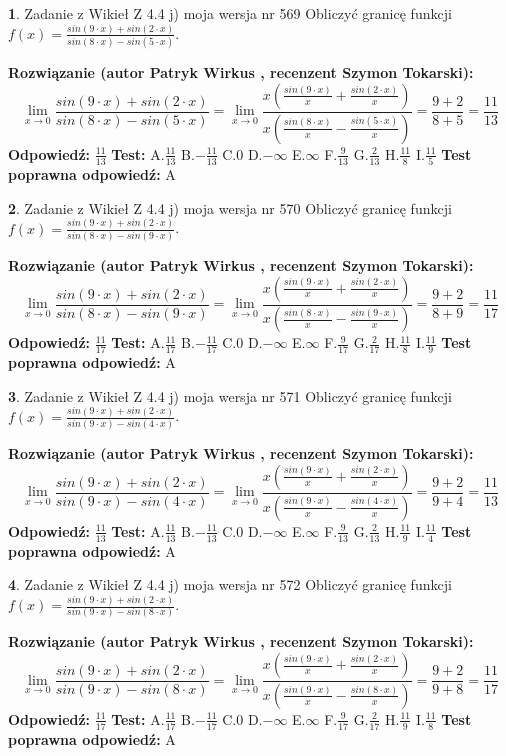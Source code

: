 \documentclass[12pt, a4paper]{article}
\theoremstyle{definition} %
\newtheorem{zad}{}
\newcommand{\zadStart}[1]{\begin{zad}#1\newline}
\newcommand{\zadStop}{\end{zad}}
\newcommand{\rozwStart}[2]{\noindent \textbf{Rozwiązanie (autor #1 , recenzent #2): }\newline}
\newcommand{\rozwStop}{\newline}
\newcommand{\odpStart}{\noindent \textbf{Odpowiedź:}\newline}
\newcommand{\odpStop}{\newline}
\newcommand{\testStart}{\noindent \textbf{Test:}\newline}
\newcommand{\testStop}{\newline}
\newcommand{\kluczStart}{\noindent \textbf{Test poprawna odpowiedź:}\newline}
\newcommand{\kluczStop}{\newline}
\begin{document}
\zadStart{Zadanie z Wikieł Z 4.4 j) moja wersja nr 569}
Obliczyć granicę funkcji $f(x)=\frac{sin(9\cdot x) +sin(2\cdot x)}{sin(8\cdot x) -sin(5\cdot x)}$.
\zadStop
\rozwStart{Patryk Wirkus}{Szymon Tokarski}
$$\lim\limits_{x\to 0}\frac{sin(9\cdot x) +sin(2\cdot x)}{sin(8\cdot x) -sin(5\cdot x)}=\lim\limits_{x\to 0}\frac{x(\frac{sin(9\cdot x)}{x}+\frac{sin(2\cdot x)}{x})}{x(\frac{sin(8\cdot x)}{x}-\frac{sin(5\cdot x)}{x})}=\frac{9+2}{8+5} = \frac{11}{13}$$
\rozwStop
\odpStart
$\frac{11}{13}$
\odpStop
\testStart
A.$\frac{11}{13}$
B.$-\frac{11}{13}$
C.$0$
D.$-\infty$
E.$\infty$
F.$\frac{9}{13}$
G.$\frac{2}{13}$
H.$\frac{11}{8}$
I.$\frac{11}{5}$
\testStop
\kluczStart
A
\kluczStop



\zadStart{Zadanie z Wikieł Z 4.4 j) moja wersja nr 570}
Obliczyć granicę funkcji $f(x)=\frac{sin(9\cdot x) +sin(2\cdot x)}{sin(8\cdot x) -sin(9\cdot x)}$.
\zadStop
\rozwStart{Patryk Wirkus}{Szymon Tokarski}
$$\lim\limits_{x\to 0}\frac{sin(9\cdot x) +sin(2\cdot x)}{sin(8\cdot x) -sin(9\cdot x)}=\lim\limits_{x\to 0}\frac{x(\frac{sin(9\cdot x)}{x}+\frac{sin(2\cdot x)}{x})}{x(\frac{sin(8\cdot x)}{x}-\frac{sin(9\cdot x)}{x})}=\frac{9+2}{8+9} = \frac{11}{17}$$
\rozwStop
\odpStart
$\frac{11}{17}$
\odpStop
\testStart
A.$\frac{11}{17}$
B.$-\frac{11}{17}$
C.$0$
D.$-\infty$
E.$\infty$
F.$\frac{9}{17}$
G.$\frac{2}{17}$
H.$\frac{11}{8}$
I.$\frac{11}{9}$
\testStop
\kluczStart
A
\kluczStop



\zadStart{Zadanie z Wikieł Z 4.4 j) moja wersja nr 571}
Obliczyć granicę funkcji $f(x)=\frac{sin(9\cdot x) +sin(2\cdot x)}{sin(9\cdot x) -sin(4\cdot x)}$.
\zadStop
\rozwStart{Patryk Wirkus}{Szymon Tokarski}
$$\lim\limits_{x\to 0}\frac{sin(9\cdot x) +sin(2\cdot x)}{sin(9\cdot x) -sin(4\cdot x)}=\lim\limits_{x\to 0}\frac{x(\frac{sin(9\cdot x)}{x}+\frac{sin(2\cdot x)}{x})}{x(\frac{sin(9\cdot x)}{x}-\frac{sin(4\cdot x)}{x})}=\frac{9+2}{9+4} = \frac{11}{13}$$
\rozwStop
\odpStart
$\frac{11}{13}$
\odpStop
\testStart
A.$\frac{11}{13}$
B.$-\frac{11}{13}$
C.$0$
D.$-\infty$
E.$\infty$
F.$\frac{9}{13}$
G.$\frac{2}{13}$
H.$\frac{11}{9}$
I.$\frac{11}{4}$
\testStop
\kluczStart
A
\kluczStop



\zadStart{Zadanie z Wikieł Z 4.4 j) moja wersja nr 572}
Obliczyć granicę funkcji $f(x)=\frac{sin(9\cdot x) +sin(2\cdot x)}{sin(9\cdot x) -sin(8\cdot x)}$.
\zadStop
\rozwStart{Patryk Wirkus}{Szymon Tokarski}
$$\lim\limits_{x\to 0}\frac{sin(9\cdot x) +sin(2\cdot x)}{sin(9\cdot x) -sin(8\cdot x)}=\lim\limits_{x\to 0}\frac{x(\frac{sin(9\cdot x)}{x}+\frac{sin(2\cdot x)}{x})}{x(\frac{sin(9\cdot x)}{x}-\frac{sin(8\cdot x)}{x})}=\frac{9+2}{9+8} = \frac{11}{17}$$
\rozwStop
\odpStart
$\frac{11}{17}$
\odpStop
\testStart
A.$\frac{11}{17}$
B.$-\frac{11}{17}$
C.$0$
D.$-\infty$
E.$\infty$
F.$\frac{9}{17}$
G.$\frac{2}{17}$
H.$\frac{11}{9}$
I.$\frac{11}{8}$
\testStop
\kluczStart
A
\kluczStop
\end{document}
